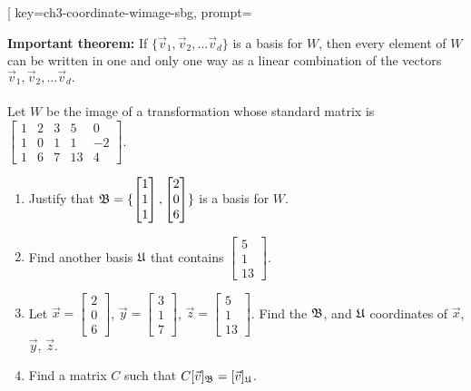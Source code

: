 
\begin{SaveQuestion}[
        key=ch3-coordinate-wimage-sbg,
        prompt={{\bf { Important theorem:} }  If $\{\vec v_1, \vec v_2, \dots \vec v_d\} $  is a basis for $W$, then every element of $W$ can be written in {\sc one and only one } way as a linear combination of the vectors $\vec v_1, \vec v_2, \dots \vec v_d.$ \\ \\ Let  $W$ be the image  of a transformation whose standard matrix is $\begin{bmatrix} 1 & 2 & 3 & 5 &  0\\   1& 0 & 1 & 1 & -2\\ 1 & 6 & 7 & 13 & 4 \end{bmatrix}$. \\\begin{enumerate}\item Justify that $\frak B = \{\begin{bmatrix} 1 \\   1\\ 1  \end{bmatrix}, \begin{bmatrix}   2 \\    0\\ 6 \end{bmatrix}\}$ is a basis for $W$.\item Find another basis $\frak U$ that contains $\begin{bmatrix}   5 \\ 1 \\ 13 \end{bmatrix}$. 
        \item Let $\vec x=\begin{bmatrix}   2 \\    0\\ 6 \end{bmatrix}$, $\vec y=\begin{bmatrix}   3 \\    1\\ 7 \end{bmatrix}$, $\vec z=\begin{bmatrix}   5\\   1\\ 13 \end{bmatrix}$. Find the $\frak B$, and $\frak U$ coordinates of $\vec x$, $\vec y$, $\vec z$. \item Find a matrix $C$ such that $C[\vec v]_\frak B=[\vec v]_\frak U$.

\end{enumerate}}
\end{SaveQuestion}
